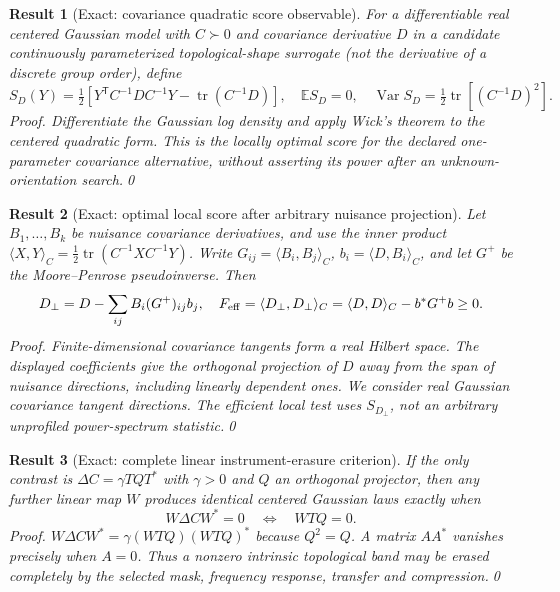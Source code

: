 \documentclass[aps,prd,onecolumn,notitlepage,groupedaddress,11pt]{revtex4-2}
\newtheorem{result}{Result}
\begin{document}
\begin{result}[\textsf{Exact}: covariance quadratic score observable]\label{new:150}
For a differentiable \emph{real} centered Gaussian model with \(C\succ0\) and covariance derivative \(D\) in a candidate continuously parameterized topological-shape surrogate (not the derivative of a discrete group order), define
\begin{equation}\label{new:eq150}
S_D(Y)=\tfrac12\left[Y^{\mathsf T}C^{-1}DC^{-1}Y-\operatorname{tr}(C^{-1}D)\right],\quad
\mathbb E S_D=0,\quad\operatorname{Var}S_D=\tfrac12\operatorname{tr}[(C^{-1}D)^2].
\end{equation}
\textit{Proof.} Differentiate the Gaussian log density and apply Wick's theorem to the centered quadratic form. This is the locally optimal score for the declared one-parameter covariance alternative, without asserting its power after an unknown-orientation search.\qed
\end{result}
\begin{result}[\textsf{Exact}: optimal local score after arbitrary nuisance projection]\label{new:151}
Let \(B_1,\ldots,B_k\) be nuisance covariance derivatives, and use the inner product \(\langle X,Y\rangle_C=\tfrac12\operatorname{tr}(C^{-1}XC^{-1}Y)\). Write \(G_{ij}=\langle B_i,B_j\rangle_C\), \(b_i=\langle D,B_i\rangle_C\), and let \(G^+\) be the Moore--Penrose pseudoinverse. Then
\begin{equation}\label{new:eq151}
D_\perp=D-\sum_{ij}B_i(G^+)_{ij}b_j,\quad
F_{\rm eff}=\langle D_\perp,D_\perp\rangle_C=\langle D,D\rangle_C-b^*G^+b\ge0.
\end{equation}
\textit{Proof.} Finite-dimensional covariance tangents form a real Hilbert space. The displayed coefficients give the orthogonal projection of \(D\) away from the span of nuisance directions, including linearly dependent ones. We consider real Gaussian covariance tangent directions. The efficient local test uses \(S_{D_\perp}\), not an arbitrary unprofiled power-spectrum statistic.\qed
\end{result}
\begin{result}[\textsf{Exact}: complete linear instrument-erasure criterion]\label{new:152}
If the only contrast is \(\Delta C=\gamma TQT^*\) with \(\gamma>0\) and \(Q\) an orthogonal projector, then any further linear map \(W\) produces identical centered Gaussian laws exactly when
\begin{equation}\label{new:eq152}
W\Delta C W^*=0\quad\Longleftrightarrow\quad WTQ=0.
\end{equation}
\textit{Proof.} \(W\Delta CW^*=\gamma(WTQ)(WTQ)^*\) because \(Q^2=Q\). A matrix \(AA^*\) vanishes precisely when \(A=0\). Thus a nonzero intrinsic topological band may be erased \emph{completely} by the selected mask, frequency response, transfer and compression.\qed
\end{result}
\end{document}
